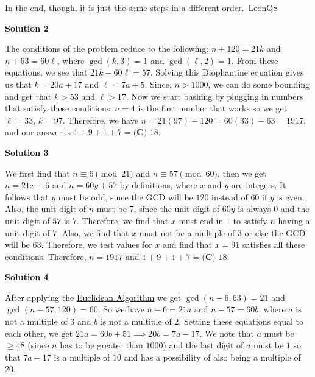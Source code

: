 \begin{enumerate}
 In the end, though, it is just the same steps in a different order.~LeonQS

 



\textbf{Solution 2}

The conditions of the problem reduce to the following: $n+120 = 21k$ and $n+63 = 60\ell$, where $\gcd(k,3) = 1$ and $\gcd(\ell,2) = 1$. From these equations, we see that $21k - 60\ell = 57$. Solving this Diophantine equation gives us that $k = 20a + 17$ and $\ell = 7a + 5$. Since, $n>1000$, we can do some bounding and get that $k > 53$ and $\ell > 17$. Now we start bashing by plugging in numbers that satisfy these conditions: $a=4$ is the first number that works so we get $\ell = 33$, $k = 97$. Therefore, we have $n=21(97)-120=60(33)-63=1917$, and our answer is $1+9+1+7=\boxed{\textbf{(C) } 18}$.

 



\textbf{Solution 3}

We first find that $n\equiv6\pmod{21}$ and $n\equiv57\pmod{60}$, then we get $n=21x+6$ and $n=60y+57$ by definitions, where $x$ and $y$ are integers. It follows that $y$ must be odd, since the GCD will be $120$ instead of $60$ if $y$ is even. Also, the unit digit of $n$ must be $7$, since the unit digit of $60y$ is always $0$ and the unit digit of $57$ is $7$. Therefore, we find that $x$ must end in $1$ to satisfy $n$ having a unit digit of $7$. Also, we find that $x$ must not be a multiple of $3$ or else the GCD will be $63$. Therefore, we test values for $x$ and find that $x=91$ satisfies all these conditions. Therefore, $n=1917$ and $1+9+1+7 = \boxed{\textbf{(C) } 18}$.

 



\textbf{Solution 4}

After applying the \href{https://artofproblemsolving.com/wiki/index.php?title=Euclidean\_Algorithm}{Euclidean Algorithm} we get $\gcd(n - 6, 63) = 21$ and $\gcd(n - 57, 120) = 60.$ So we have $n - 6 = 21a$ and $n - 57 = 60b$, where $a$ is not a multiple of $3$ and $b$ is not a multiple of $2.$ Setting these equations equal to each other, we get $21a = 60b + 51 \implies 20b = 7a - 17.$ We note that $a$ must be $\geq 48$ (since $n$ has to be greater than $1000$) and the last digit of $a$ must be $1$ so that $7a - 17$ is a multiple of $10$ and has a possibility of also being a multiple of 20.

 



\end{enumerate}
